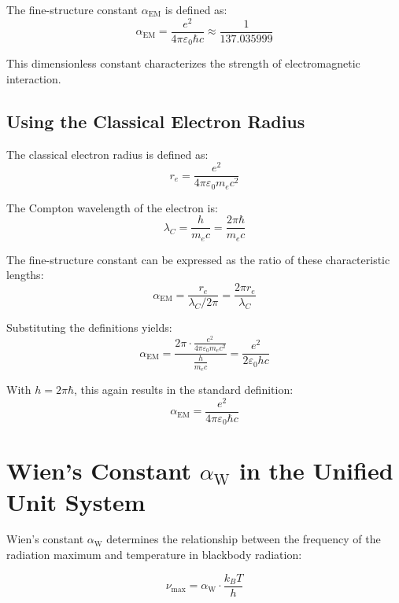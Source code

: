 \documentclass[12pt,a4paper]{article}
\newcommand{\alphaEM}{\alpha_{\text{EM}}}
\newcommand{\alphaW}{\alpha_{\text{W}}}
\begin{document}
	The fine-structure constant \(\alphaEM\) is defined as:
	\begin{equation}
		\alphaEM = \frac{e^2}{4\pi \varepsilon_0 \hbar c} \approx \frac{1}{137.035999}
	\end{equation}
	
	This dimensionless constant characterizes the strength of electromagnetic interaction.
	
	\subsection{Using the Classical Electron Radius}
	
	The classical electron radius is defined as:
	\begin{equation}
		r_e = \frac{e^2}{4\pi \varepsilon_0 m_e c^2}
	\end{equation}
	
	The Compton wavelength of the electron is:
	\begin{equation}
		\lambda_C = \frac{h}{m_e c} = \frac{2\pi\hbar}{m_e c}
	\end{equation}
	
	The fine-structure constant can be expressed as the ratio of these characteristic lengths:
	\begin{equation}
		\alphaEM = \frac{r_e}{\lambda_C/2\pi} = \frac{2\pi r_e}{\lambda_C}
	\end{equation}
	
	Substituting the definitions yields:
	\begin{equation}
		\alphaEM = \frac{2\pi \cdot \frac{e^2}{4\pi \varepsilon_0 m_e c^2}}{\frac{h}{m_e c}} = \frac{e^2}{2\varepsilon_0 h c}
	\end{equation}
	
	With \(h = 2\pi\hbar\), this again results in the standard definition:
	\begin{equation}
		\alphaEM = \frac{e^2}{4\pi \varepsilon_0 \hbar c}
	\end{equation}
	
	\section{Wien’s Constant \(\alphaW\) in the Unified Unit System}
	
	Wien’s constant \(\alphaW\) determines the relationship between the frequency of the radiation maximum and temperature in blackbody radiation:
	
	\begin{equation}
		\nu_{\text{max}} = \alphaW \cdot \frac{k_B T}{h}
	\end{equation}
	
\end{document}
